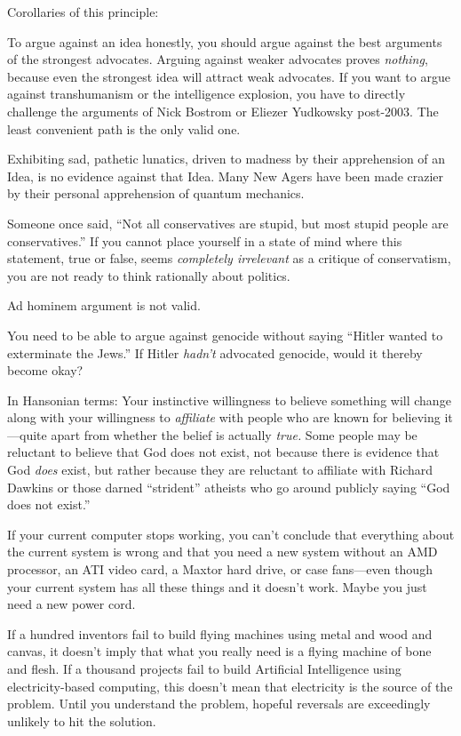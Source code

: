 {
 Corollaries of this principle:}

{
 To argue against an idea honestly, you should argue against the
best arguments of the strongest advocates. Arguing against weaker
advocates proves \textit{nothing}, because even the strongest idea will
attract weak advocates. If you want to argue against transhumanism or
the intelligence explosion, you have to directly challenge the
arguments of Nick Bostrom or Eliezer Yudkowsky post-2003. The least
convenient path is the only valid one.}

{
 Exhibiting sad, pathetic lunatics, driven to madness by their
apprehension of an Idea, is no evidence against that Idea. Many New
Agers have been made crazier by their personal apprehension of quantum
mechanics.}

{
 Someone once said, ``Not all conservatives are
stupid, but most stupid people are conservatives.''
If you cannot place yourself in a state of mind where this statement,
true or false, seems \textit{completely irrelevant} as a critique of
conservatism, you are not ready to think rationally about politics.}

{
 Ad hominem argument is not valid.}

{
 You need to be able to argue against genocide without saying
``Hitler wanted to exterminate the
Jews.'' If Hitler \textit{hadn't}
advocated genocide, would it thereby become okay?}

{
 In Hansonian terms: Your instinctive willingness to believe
something will change along with your willingness to \textit{affiliate}
with people who are known for believing it---quite apart from whether
the belief is actually \textit{true.} Some people may be reluctant to
believe that God does not exist, not because there is evidence that God
\textit{does} exist, but rather because they are reluctant to affiliate
with Richard Dawkins or those darned
``strident'' atheists who go around
publicly saying ``God does not
exist.''}

{
 If your current computer stops working, you can't
conclude that everything about the current system is wrong and that you
need a new system without an AMD processor, an ATI video card, a Maxtor
hard drive, or case fans---even though your current system has all
these things and it doesn't work. Maybe you just need a
new power cord.}

{
 If a hundred inventors fail to build flying machines using metal
and wood and canvas, it doesn't imply that what you
really need is a flying machine of bone and flesh. If a thousand
projects fail to build Artificial Intelligence using electricity-based
computing, this doesn't mean that electricity is the
source of the problem. Until you understand the problem, hopeful
reversals are exceedingly unlikely to hit the solution.}

